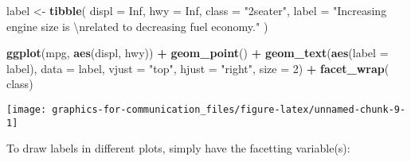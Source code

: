 \documentclass[]{book}
\newenvironment{Shaded}{\begin{snugshade}}{\end{snugshade}}
\newcommand{\CharTok}[1]{\textcolor[rgb]{0.31,0.60,0.02}{#1}}
\newcommand{\DataTypeTok}[1]{\textcolor[rgb]{0.13,0.29,0.53}{#1}}
\newcommand{\DecValTok}[1]{\textcolor[rgb]{0.00,0.00,0.81}{#1}}
\newcommand{\KeywordTok}[1]{\textcolor[rgb]{0.13,0.29,0.53}{\textbf{#1}}}
\newcommand{\NormalTok}[1]{#1}
\newcommand{\OperatorTok}[1]{\textcolor[rgb]{0.81,0.36,0.00}{\textbf{#1}}}
\newcommand{\OtherTok}[1]{\textcolor[rgb]{0.56,0.35,0.01}{#1}}
\newcommand{\StringTok}[1]{\textcolor[rgb]{0.31,0.60,0.02}{#1}}
\theoremstyle{plain}
\theoremstyle{remark}
\theoremstyle{definition}
\theoremstyle{definition}
\theoremstyle{definition}
\theoremstyle{remark}
\begin{document}
\begin{Shaded}
\begin{Highlighting}[]
\NormalTok{label <-}\StringTok{ }\KeywordTok{tibble}\NormalTok{(}
  \DataTypeTok{displ =} \OtherTok{Inf}\NormalTok{,}
  \DataTypeTok{hwy =} \OtherTok{Inf}\NormalTok{,}
  \DataTypeTok{class =} \StringTok{"2seater"}\NormalTok{,}
  \DataTypeTok{label =} \StringTok{"Increasing engine size is }\CharTok{\textbackslash{}n}\StringTok{related to decreasing fuel economy."}
\NormalTok{)}

\KeywordTok{ggplot}\NormalTok{(mpg, }\KeywordTok{aes}\NormalTok{(displ, hwy)) }\OperatorTok{+}
\StringTok{  }\KeywordTok{geom_point}\NormalTok{() }\OperatorTok{+}
\StringTok{  }\KeywordTok{geom_text}\NormalTok{(}\KeywordTok{aes}\NormalTok{(}\DataTypeTok{label =}\NormalTok{ label), }\DataTypeTok{data =}\NormalTok{ label, }\DataTypeTok{vjust =} \StringTok{"top"}\NormalTok{, }\DataTypeTok{hjust =} \StringTok{"right"}\NormalTok{,}
            \DataTypeTok{size =} \DecValTok{2}\NormalTok{) }\OperatorTok{+}
\StringTok{  }\KeywordTok{facet_wrap}\NormalTok{(}\OperatorTok{~}\StringTok{ }\NormalTok{class)}
\end{Highlighting}
\end{Shaded}

\begin{center}\texttt{[image: graphics-for-communication\_files/figure-latex/unnamed-chunk-9-1]} \end{center}

To draw labels in different plots, simply have the facetting
variable(s):

\begin{Shaded}
\end{Shaded}
\end{document}
